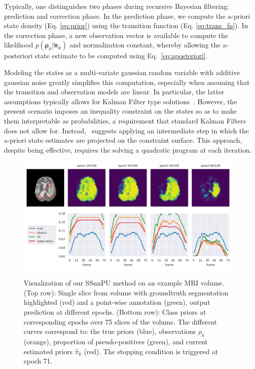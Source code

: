 

Typically, one distinguishes two phases during recursive Bayesian filtering: prediction and correction phase. In the prediction phase, we compute the a-priori state density (Eq. \ref{eq:prior}) using the transition function (Eq. \ref{eq:trans_fn}).
In the correction phase, a new observation vector is available to compute the likelihood $p(\bm{\rho}_{k}|\bm{\tilde\pi}_{k})$ and normalization constant, whereby allowing the a-posteriori state estimate to be computed using Eq.~\eqref{eq:aposteriori}.

Modeling the states as a multi-variate gaussian random variable with additive gaussian noise greatly simplifies this computation, especially when assuming that the transition and observation models are linear. In particular, the latter assumptions typically allows for Kalman Filter type solutions~\cite{kalman1960}. However, the present scenario imposes an inequality constraint on the states so as to make them interpretable as probabilities, a requirement that standard Kalman Filters does not allow for. Instead,~\cite{gupta07} suggests applying an intermediate step in which the a-priori state estimates are projected on the constraint surface. This approach, despite being effective, requires the solving a quadratic program at each iteration.
\begin{figure}[t]
\caption{Visualization of our SSnnPU method on an example MRI volume. (Top row): Single slice from volume with groundtruth segmentation highlighted (red) and a point-wise annotation (green), output prediction at different epochs. (Bottom row): Class priors at corresponding epochs over 75 slices of the volume. The different curves correspond to: the true priors (blue), observations $\rho_{k}$ (orange), proportion of pseudo-positives (green), and current estimated priors $\hat\pi_{k}$ (red). The stopping condition is triggered at epoch 71.}
\centering
    \includegraphics[width=.9\textwidth]{pics/prevs_conv.png}
\label{fig:prevs_conv}
\end{figure}


